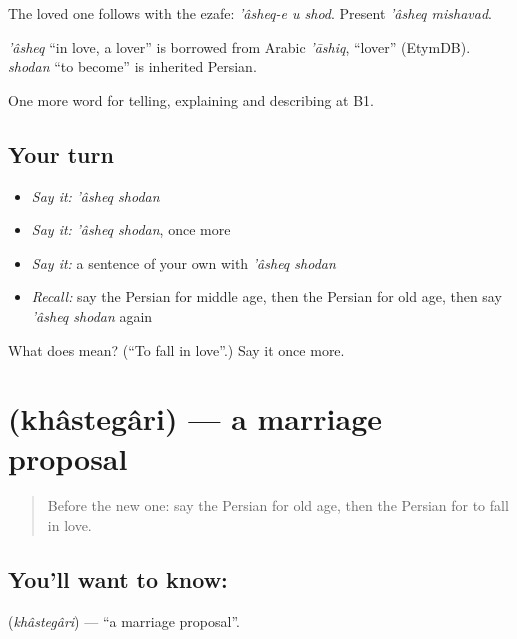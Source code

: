 The loved one follows with the ezafe: \emph{'âsheq-e u shod}. Present \emph{'âsheq mishavad}.

\begin{cousinweb}
\emph{'âsheq} \textquotedblleft{}in love, a lover\textquotedblright{} is borrowed from Arabic \emph{'āshiq}, \textquotedblleft{}lover\textquotedblright{} (EtymDB). \emph{shodan} \textquotedblleft{}to become\textquotedblright{} is inherited Persian.
\end{cousinweb}

\begin{grammarlens}[title={What you've built}]
One more word for telling, explaining and describing at B1.
\end{grammarlens}

\subsection*{Your turn}
\begin{itemize}
\raggedright
  \item \emph{Say it:} \emph{'âsheq shodan}
  \item \emph{Say it:} \emph{'âsheq shodan}, once more
  \item \emph{Say it:} a sentence of your own with \emph{'âsheq shodan}
  \item \emph{Recall:} say the Persian for middle age, then the Persian for old age, then say \emph{'âsheq shodan} again
\end{itemize}

\begin{tcolorbox}[breakable,colback=teal!4,colframe=teal!35!black,title={Before you move on}]
What does   mean? (\textquotedblleft{}To fall in love\textquotedblright{}.) Say it once more.
\end{tcolorbox}
\section[\texorpdfstring{\fa{خواستگاری} (khâstegâri)}{خواستگاری (khâstegâri)}]{ (khâstegâri) — a marriage proposal}

\label{lesson:FA-C334-khastegari}



\begin{quote}
Before the new one: say the Persian for old age, then the Persian for to fall in love.
\end{quote}

\subsection*{You'll want to know: }
\textbf{} (\emph{khâstegâri}) — \textquotedblleft{}a marriage proposal\textquotedblright{}.

